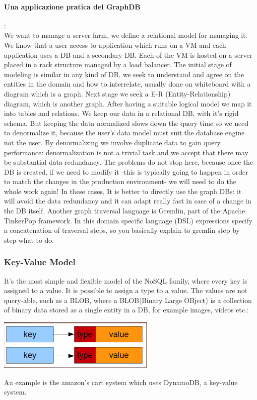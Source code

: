 \documentclass[a4page, 11pt]{article}
\begin{document}
\paragraph{Una applicazione pratica del GraphDB}:\\ 
We want to manage a server farm, we define a relational model for managing it. 
We know that a user access to application which runs on a VM and each application uses a DB and a secondary DB. 
Each of the VM is hosted on a server placed in a rack structure managed by a load balancer.
\newline
The initial stage of modeling is similar in any kind of DB, we seek to understand and agree on the entities in the domain and how to interrelate, usually done on whiteboard with a diagram which is a graph.
Next stage we seek a E-R (Entity-Relationship) diagram, which is another graph. 
After having a suitable logical model we map it into tables and relations. 
We keep our data in a relational DB, with it's rigid schema.
But keeping the data normalized slows down the query time so we need to denormalize it, because the user's data model must suit the database engine not the user. 
By denormalizing we involve duplicate data to gain query performance: denormalization is not a trivial task and we accept that there may be substantial data redundancy. 
The problems do not stop here, because once the DB is created, if we need to modify it -this is typically going to happen in order to match the changes in the production environment- we will need to do the whole work again!
\newline
In these cases, It is better to directly use the graph DBs: it will avoid the data redundancy and it can adapt really fast in case of a change in the DB itself.
\newline
Another graph traversal language is Gremlin, part of the Apache TinkerPop framework. In this domain specific language (DSL) expressions specify a concatenation of traversal steps, so you basically explain to gremlin step by step what to do.

\subsubsection{Key-Value Model}

It's the most simple and flexible model of the NoSQL family, where every key is assigned to a value. It is possible to assign a type to a value.
The values are not query-able, such as a BLOB, where a BLOB(Binary Large OBject) is a collection of binary data stored as a single entity in a DB, for example images, videos etc.:
\begin{center}
\includegraphics[scale=0.5]{IMAGE3.jpg}
\end{center}
An example is the amazon's cart system which uses DynamoDB, a key-value system.
\end{document}
